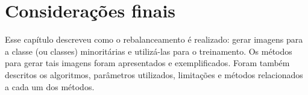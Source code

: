 %
%


\section{Considerações finais}

Esse capítulo descreveu como o rebalanceamento é realizado: gerar imagens para a classe (ou classes) minoritárias e utilizá-las para o treinamento. Os métodos para gerar tais imagens foram apresentados e exemplificados. Foram também descritos os algoritmos, parâmetros utilizados, limitações e métodos relacionados a cada um dos métodos.

